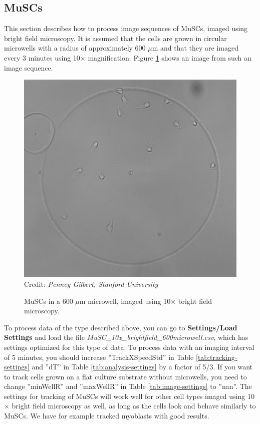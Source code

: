 \documentclass[a4paper, oneside, onecolumn, 11pt]{article}
\newcommand{\menu}[1]{\textbf{#1}}
\newcommand{\file}[1]{\emph{#1}}
\newcommand{\setting}[1]{''#1''}
\newcommand{\credit}[1]{\raggedleft \scriptsize Credit:\emph{ #1}}
\begin{document}
\subsection{MuSCs}
\label{sec:MuSC}
This section describes how to process image sequences of MuSCs, imaged using bright field microscopy. It is assumed that the cells are grown in circular microwells with a radius of approximately 600 $\mu$m and that they are imaged every 3 minutes using 10$\times$ magnification. Figure \ref{fig:MuSC} shows an image from such an image sequence.

\begin{figure}[!htb]
\begin{center}
\includegraphics[width = \columnwidth]{figures/MuSC}
\credit{Penney Gilbert, Stanford University}
\caption{MuSCs in a 600 $\mu$m microwell, imaged using 10$\times$ bright field microscopy.}
\label{fig:MuSC}
\end{center}
\end{figure}

To process data of the type described above, you can go to \menu{Settings/\allowbreak Load Settings} and load the file \file{MuSC\_\allowbreak  10x\_\allowbreak brightfield\_\allowbreak 600microwell.csv}, which has settings optimized for this type of data. To process data with an imaging interval of 5 minutes, you should increase \setting{TrackXSpeedStd} in Table \ref{tab:tracking-settings} and \setting{dT} in Table \ref{tab:analysis-settings} by a factor of 5/3. If you want to track cells grown on a flat culture substrate without microwells, you need to change \setting{minWellR} and \setting{maxWellR} in Table \ref{tab:image-settings} to \setting{nan}. The settings for tracking of MuSCs will work well for other cell types imaged using 10$\times$ bright field microscopy as well, as long as the cells look and behave similarly to MuSCs. We have for example tracked myoblasts with good results.
\end{document}
